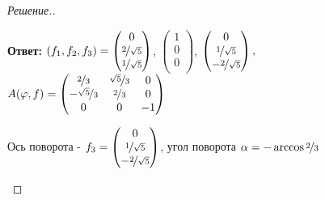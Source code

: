 \documentclass[a4paper]{article}
\theoremstyle{remark}
\begin{document}
\begin{proof}[Решение.]
\begin{enumerate}
                \textbf{Ответ:} $(f_1, f_2, f_3) = 
                \begin{pmatrix}
                    0 \\
                    \nicefrac2{\sqrt{5}} \\
                    \nicefrac1{\sqrt{5}}\\
                \end{pmatrix}$, $\begin{pmatrix}
                    1 \\
                    0 \\
                    0\\
                \end{pmatrix}$, 
                $
                \begin{pmatrix}
                    0\\
                    \nicefrac1{\sqrt{5}}\\
                    -\nicefrac2{\sqrt{5}}
                \end{pmatrix}, 
                $
                $A(\varphi, f) = 
                \begin{pmatrix}
                    \nicefrac23 & \nicefrac{\sqrt{5}}{3} & 0 \\
                    -\nicefrac{\sqrt{5}}{3} & \nicefrac23 & 0 \\
                    0 & 0 & -1 \\
                \end{pmatrix} 
                $

                Ось поворота - $f_3 = 
                \begin{pmatrix}
                    0\\
                    \nicefrac1{\sqrt{5}}\\
                    -\nicefrac2{\sqrt{5}}
                \end{pmatrix} 
                $, угол поворота $\alpha = - \arccos{\nicefrac{2}{3}}$
            \end{enumerate}


        \end{proof}

\end{document}
